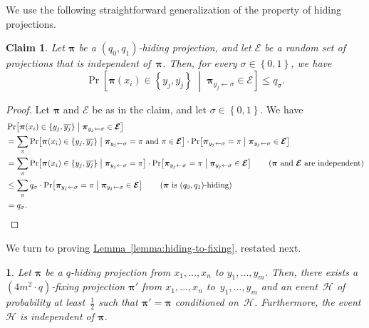 \documentclass[11pt]{article}
\makeatletter
\numberwithin{equation}{section}
\newtheorem{claim}[theorem]{Claim}
\theoremstyle{definition}
\theoremstyle{plain}
\newcommand{\expref}[2]{\hyperref[#2]{#1~\ref{#2}}}
\theoremstyle{definition}\newtheorem{notation}[theorem]{Notation}\theoremstyle{plain}
\newcommand{\B}{\left\{ 0,1 \right \}}
\newcommand{\p}{\boldsymbol{\pi}}
\newcommand{\cH}{\mathcal{H}}
\newcommand{\cbE}{\boldsymbol{\mathcal{E}}}
\theoremstyle{definition}
\theoremstyle{plain}
\newtheorem*{restated@theorem}{\rep@title}
\newenvironment{restated}[1]{%
	 \def\rep@title{#1}%
	 \begin{restated@theorem}}%
	{\end{restated@theorem}}
\makeatother
\begin{document}
We use the following straightforward generalization of the property
of hiding projections. 
\begin{claim}
\label{claim:generalized-hiding}Let $\p$ be a $(q_{0},q_{1})$-hiding
projection, and let $\cbE$ be a random set of projections that is
independent of~$\p$. Then, for every $\sigma\in\B$, we have
\[
\Pr\!\left[\p(x_{i})\in\left\{ y_{j},\overline{y_{j}}\right\} \;\middle|\;\p_{y_{j}\gets\sigma}\in\cbE\right]\le q_{\sigma}.
\]
\end{claim}
%
\begin{proof}
Let $\p$ and $\cbE$ be as in the claim, and let $\sigma\in\B$.
We have 
\begin{align*}
 & \Pr\!\left[\p(x_{i})\in\left\{ y_{j},\overline{y_{j}}\right\} \;\middle|\;\p_{y_{j}\gets\sigma}\in\cbE\right]\\
 & =\sum_{\pi}\Pr\!\left[\p(x_{i})\in\left\{ y_{j},\overline{y_{j}}\right\} \;\middle|\;\p_{y_{j}\gets\sigma}=\pi\text{~and~}\pi\in\cbE\right]\cdot\Pr\!\left[\p_{y_{j}\gets\sigma}=\pi\;\middle|\;\p_{y_{j}\gets\sigma}\in\cbE\right]\\
 & =\sum_{\pi}\Pr\!\left[\p(x_{i})\in\left\{ y_{j},\overline{y_{j}}\right\} \;\middle|\;\p_{y_{j}\gets\sigma}=\pi\right]\cdot\Pr\!\left[\p_{y_{j}\gets\sigma}=\pi\;\middle|\;\p_{y_{j}\gets\sigma}\in\cbE\right]\tag{\ensuremath{\p} and \ensuremath{\cbE} are independent}\\
 & \le\sum_{\pi}q_{\sigma}\cdot\Pr\!\left[\p_{y_{j}\gets\sigma}=\pi\;\middle|\;\p_{y_{j}\gets\sigma}\in\cbE\right]\tag{\ensuremath{\p} is \ensuremath{(q_{0},q_{1})}-hiding}\\
 & =q_{\sigma}.\qedhere
\end{align*}
\end{proof}

We turn to proving \expref{Lemma}{lemma:hiding-to-fixing},
restated next.
\begin{restated}{\expref{Lemma}{lemma:hiding-to-fixing}}
Let $\p$ be a $q$-hiding projection from $x_{1},\ldots,x_{n}$
to $y_{1},\ldots,y_{m}$. Then, there exists a $(4m^{2}\cdot q)$-fixing
projection $\p'$ from $x_{1},\ldots,x_{n}$ to~$y_{1},\ldots,y_{m}$
and an event~$\cH$ of probability at least~$\frac{1}{2}$ such
that $\p'=\p$ conditioned on~$\cH$. Furthermore, the event $\cH$
is independent of $\p$.
\end{restated}
\end{document}
